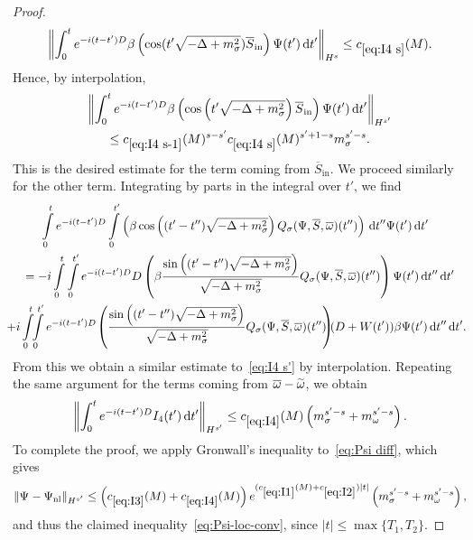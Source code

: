 \documentclass[10pt]{amsart}
\theoremstyle{definition}\newtheorem{defi}[theo]{Definition}\newtheorem{rema}[theo]{Remark}\newtheorem{exam}[theo]{Example}\newtheorem{exem}[theo]{Example}\newtheorem{nota}[theo]{Notation}
\newcommand{\rmin}{\mathrm{in}}
\newcommand{\nl}{\mathrm{nl}}
\renewcommand\tilde{\widetilde}
\renewcommand\d[1]{{\ensuremath{\,\text{d}#1}}}
\let\oldtilde\tilde
\renewcommand*{\tilde}[1]{\mathchoice{\widetilde{#1}}{\widetilde{#1}}{\oldtilde{#1}}{\oldtilde{#1}}}
\begin{document}
\begin{proof}
\begin{equation}
\left\| \int_0^t e^{-i(t-t')D}\beta \left(\cos(t'\sqrt{-\Delta + m^2_\sigma})\overline{S}_\rmin\right)\Psi(t') \d t'\right\|_{H^{s}}
\leq c_{\eqref{eq:I4 s}} (M).
\end{equation}
Hence, by interpolation,
\begin{multline}\label{eq:I4 s'}
\left\| \int_0^t e^{-i(t-t')D}\beta \left(\cos\left(t'\sqrt{-\Delta + m^2_\sigma}\right)\overline{S}_\rmin\right)\Psi(t') \d t'\right\|_{H^{s'}}\\
\leq c_{\eqref{eq:I4 s-1}}(M)^{s-s'} c_{\eqref{eq:I4 s}}(M)^{s'+1-s} m_\sigma^{s'-s}.
\end{multline}
This is the desired estimate for the term coming from $\overline{S}_\rmin$. We proceed similarly for the other term. Integrating by parts in the integral over $t'$, we find
\begin{multline*}
\mkern-14mu\int\limits_0^t e^{-i(t-t')D}\int\limits_0^{t'} \left(\beta\cos\left((t'-t'')\sqrt{-\Delta + m^2_\sigma}\right) Q_\sigma(\Psi,\overline{S}, \overline{\omega})(t'')\right)\d t'' \Psi(t')\d t' \\
= -i \int\limits_0^t \int\limits_0^{t'} e^{-i(t-t')D} D \left(\beta \frac{\sin\left((t'-t'')\sqrt{-\Delta + m^2_\sigma}\right)}{\sqrt{-\Delta + m^2_\sigma}} Q_\sigma(\Psi,\overline{S}, \overline{\omega})(t'')\right) \Psi(t')\d t'' \d t'\\
\mkern-10mu + i \int\limits_0^t\!\!\int\limits_0^{t'} e^{-i(t-t')D}\hspace{-1pt}\left(\frac{\sin\left((t'-t'')\sqrt{-\Delta + m^2_\sigma}\right)}{\sqrt{-\Delta + m^2_\sigma}} Q_\sigma(\Psi,\overline{S}, \overline{\omega})(t'')\!\!\right)\hspace{-4pt}(D+W(t'))\beta\Psi(t')\d t'' \d t'.
\end{multline*}
From this we obtain a similar estimate to~\eqref{eq:I4 s'} by interpolation. Repeating the same argument for the terms coming from $\overline{\omega}-\tilde{\omega}$, we obtain
\begin{equation}\label{eq:I4}
\left\|\int_0^te^{-i(t-t')D}I_4(t')\d t'\right\|_{H^{s'}}\leq c_{\eqref{eq:I4}}(M) \left(m_\sigma^{s'-s} + m_\omega^{s'-s}\right).
\end{equation}
To complete the proof, we apply Gronwall's inequality to~\eqref{eq:Psi diff}, which gives
\begin{equation}
\|\Psi_{{}}-\Psi_{\nl}\|_{H^{s'}}
\leq \left(c_{\eqref{eq:I3}}(M) + c_{\eqref{eq:I4}}(M)\right)e^{(c_{\eqref{eq:I1}}(M) +c_{\eqref{eq:I2}}) |t|} \left(m_\sigma^{s'-s}+m_{\omega}^{s'-s}\right),
\end{equation}
and thus the claimed inequality~\eqref{eq:Psi-loc-conv}, since $|t|\leq \max\{T_1,T_2\}$.
\end{proof}
\end{document}
